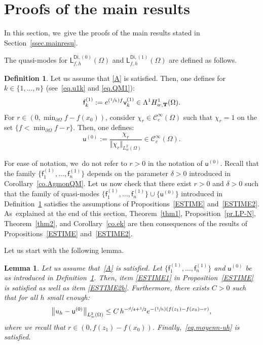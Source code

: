 \documentclass[10pt]{amsart}
\newcommand{\Psfrac}[2]{(\sfrac{#1}{#2})}
\newcommand{\mbf}[1]{\mathbf{#1}}
\theoremstyle{plain}
\newtheorem{lemma}[proposition]{Lemma}
\theoremstyle{definition}
\newtheorem{definition}[proposition]{Definition}
\begin{document}
\section{Proofs of the main results}\label{sec.mainresu}
In this section, we~give the proofs of the main results stated in Section~\ref{ssec.mainresu}.

\label{sec.proof0}

The quasi-modes for $\mathsf L^{\mathsf{Di},(0)}_{f,h}(\Omega)$ and $\mathsf L^{\mathsf{Di},(1)}_{f,h}(\Omega)$ are defined as follows.

\begin{definition}\label{de.QM-pi}
Let us assume that \ref{A} is satisfied. Then, one defines for $k\in\{1,\ldots,n\}$
(see~\eqref{eq.u1k} and \eqref{eq.QM1}):
\[
\mathsf f_k^{(1)}:= e^{\Psfrac 1h f} \mathsf v_k^{(1)} \in \Lambda^1H^1_{w,\mbf T}(\Omega).
\]
For $r\in (0,\min_{\partial \Omega}f- f(x_0))$, consider $\chi_r\in \mathcal C^\infty_c(\Omega)$ such that $\chi_r=1$ on the set $\{f<\min_{\partial \Omega}f-r\}$. Then, one defines:
\[
\mathsf u^{(0)}:= \frac{\chi_r}{\Vert \chi_r\Vert_{L^2_w(\Omega)}}
\in \mathcal C^\infty_c (\Omega).
\]
\end{definition}

For ease of notation, we~do not refer to $r>0$ in the notation of $
\mathsf u^{(0)}$. Recall that the family $\{\mathsf f_1^{(1)},
\ldots, \mathsf f_n^{(1)}\} $ depends on the parameter $\delta >0$
introduced in Corollary~\ref{co.AgmonQM}.
Let us now check that there exist $r>0$ and $\delta >0$ such that the family of quasi-modes $\{\mathsf f_1^{(1)}, \ldots, \mathsf f_n^{(1)}\} \cup \{ \mathsf u^{(0)} \}$ introduced in Definition~\ref{de.QM-pi} satisfies the assumptions of Propositions~\ref{ESTIME} and~\ref{ESTIME2}. As~explained at the end of this section, Theorem~\ref{thm1}, Proposition~\ref{pr.LP-N}, Theorem~\ref{thm2}, and Corollary~\ref{co.ek} are then consequences of the results of Propositions~\ref{ESTIME} and~\ref{ESTIME2}.

Let us start with the following lemma.
\begin{lemma}\label{de1}
Let us assume that~\ref{A} is satisfied. Let $\{\mathsf f_1^{(1)}, \ldots, \mathsf f_n^{(1)}\} $ and $\mathsf u^{(0)}$ be as introduced in Definition~\ref{de.QM-pi}.
Then, item \eqref{ESTIME1} in Proposition~\ref{ESTIME} is satisfied as well as item \eqref{ESTIME2b}. Furthermore, there exists $C>0$ such that for all $h$ small enough:
\begin{equation}\label{eq.QM0-}
\big \Vert u_h - \mathsf u^{(0)}\big \Vert_{ L_w^2(\Omega)} \le C \, h^{-\sfrac d4 +\sfrac 12} e^{-\Psfrac 1h (f(z_1)-f(x_0)-r)},
\end{equation}
where we recall that $r\in (0,f(z_1)- f(x_0))$.
Finally,~\eqref{eq.moyenn-uh} is satisfied.
\end{lemma}
\end{document}
